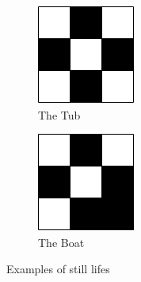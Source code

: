 \documentclass{l4proj}
\begin{document}
\begin{figure}[h]
\begin{subfigure}[b]{0.2\textwidth}
    \includegraphics[width=\textwidth]{dissertation/images/gol_structures/still_life_2.png} 
    \caption{The Tub}
    \label{fig:subim1}
\end{subfigure}
\hfill
\begin{subfigure}[b]{0.2\textwidth}
    \includegraphics[width=\textwidth]{dissertation/images/gol_structures/still_life_3.png} 
    \caption{The Boat}
    \label{fig:subim1}
\end{subfigure}

\caption{Examples of still lifes}
\end{figure}
\end{document}
